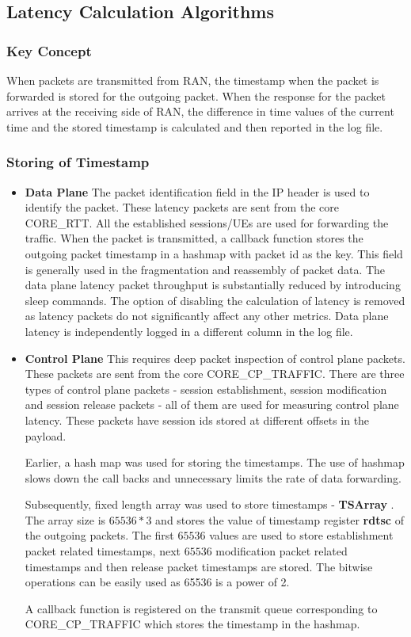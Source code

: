 \subsection{Latency Calculation Algorithms}
\subsubsection{Key Concept}
When packets are transmitted from RAN, the timestamp when the packet is forwarded is stored for the outgoing packet. When the response for the packet arrives at the receiving side of RAN, the difference in time values of the current time and the stored timestamp  is calculated and then reported in the log file.
\subsubsection{Storing of Timestamp}
\begin{itemize}
	\item \textbf{Data Plane} The packet identification field in the IP header is used to identify the packet. These latency packets
	      are sent from the core CORE\_RTT. All the established sessions/UEs are used for forwarding the traffic. When the packet is
	      transmitted, a callback  function stores the outgoing packet timestamp in a hashmap with packet id as the key. This field is
	      generally used in the fragmentation and reassembly of packet data. The data plane latency packet throughput is substantially reduced by introducing sleep commands. The option of disabling the calculation of latency is removed as latency packets do not significantly affect any other metrics. Data plane latency is independently logged in a different column in the log file.
	\item \textbf{Control Plane}
	      This requires deep packet inspection of control plane packets. These packets are sent from the core CORE\_CP\_TRAFFIC.
	      There are three types of control plane packets - session establishment, session modification and session release packets - all of
	      them are used for measuring control plane latency. These packets have session ids stored at
	      different offsets in the payload.

	      Earlier, a hash map was used for storing the timestamps. The use of hashmap slows down the call backs and unnecessary limits the rate of data forwarding.

	      Subsequently, fixed length array was used to store timestamps - \textbf{TSArray} . The
	      array size is $65536 * 3$ and stores the value of timestamp register \textbf{rdtsc} of the
	      outgoing packets. The first $65536$ values are used to store establishment packet related
	      timestamps, next $65536$ modification packet related timestamps and then release packet
	      timestamps are stored.
	      The bitwise operations can be easily used as 65536 is a power of 2.


	      A callback function is registered on  the transmit queue corresponding to CORE\_CP\_TRAFFIC which stores the timestamp in the hashmap.
\end{itemize}
